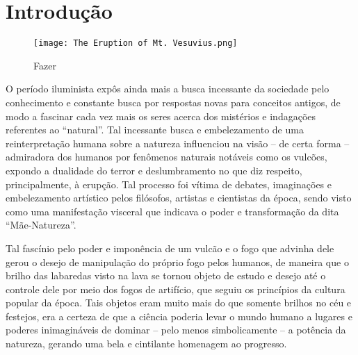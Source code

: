\chapter{Introdução}

\begin{figure}[htbp]
  \centering
  \texttt{[image: The Eruption of Mt. Vesuvius.png]}
  \caption{\fontsize{8}{8}\selectfont Fazer}
  \label{fig:exemplo}
\end{figure}

\fontsize{12}{14}\selectfont
O período iluminista expôs ainda mais a busca incessante da sociedade pelo conhecimento e constante busca por respostas novas para conceitos antigos, de modo a fascinar cada vez mais os seres acerca dos mistérios e indagações referentes ao “natural”. Tal incessante busca e embelezamento de uma reinterpretação humana sobre a natureza influenciou na visão – de certa forma – admiradora dos humanos por fenômenos naturais notáveis como os vulcões, expondo a dualidade do terror e deslumbramento no que diz respeito, principalmente, à erupção. Tal processo foi vítima de debates, imaginações e embelezamento artístico pelos filósofos, artistas e cientistas da época, sendo visto como uma manifestação visceral que indicava o poder e transformação da dita “Mãe-Natureza”.

Tal fascínio pelo poder e imponência de um vulcão e o fogo que advinha dele gerou o desejo de manipulação do próprio fogo pelos humanos, de maneira que o brilho das labaredas visto na lava se tornou objeto de estudo e desejo até o controle dele por meio dos fogos de artifício, que seguiu os princípios da cultura popular da época. Tais objetos eram muito mais do que somente brilhos no céu e festejos, era a certeza de que a ciência poderia levar o mundo humano a lugares e poderes inimagináveis de dominar – pelo menos simbolicamente – a potência da natureza, gerando uma bela e cintilante homenagem ao progresso.